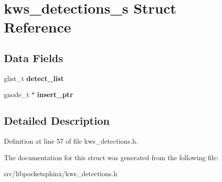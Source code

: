 \section{kws\+\_\+detections\+\_\+s Struct Reference}
\label{structkws__detections__s}
\subsection*{Data Fields}
\begin{DoxyCompactItemize}
\item 
glist\+\_\+t {\bfseries detect\+\_\+list}\label{structkws__detections__s_a96d224eef9abcc3029e0f8f20e5d6bcf}

\item 
gnode\+\_\+t $\ast$ {\bfseries insert\+\_\+ptr}\label{structkws__detections__s_adc9f53e7499f8ed97124c458eb43fbe4}

\end{DoxyCompactItemize}


\subsection{Detailed Description}


Definition at line 57 of file kws\+\_\+detections.\+h.



The documentation for this struct was generated from the following file\+:\begin{DoxyCompactItemize}
\item 
src/libpocketsphinx/kws\+\_\+detections.\+h\end{DoxyCompactItemize}
